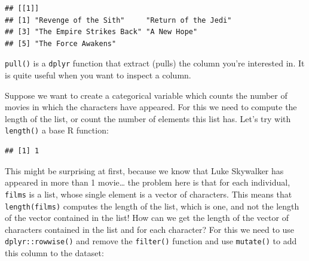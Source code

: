 \documentclass[]{gitbook}
\newenvironment{Shaded}{\begin{snugshade}}{\end{snugshade}}
\newcommand{\DataTypeTok}[1]{\textcolor[rgb]{0.13,0.29,0.53}{#1}}
\newcommand{\KeywordTok}[1]{\textcolor[rgb]{0.13,0.29,0.53}{\textbf{#1}}}
\newcommand{\NormalTok}[1]{#1}
\newcommand{\OperatorTok}[1]{\textcolor[rgb]{0.81,0.36,0.00}{\textbf{#1}}}
\newcommand{\StringTok}[1]{\textcolor[rgb]{0.31,0.60,0.02}{#1}}
\begin{document}
\begin{verbatim}
## [[1]]
## [1] "Revenge of the Sith"     "Return of the Jedi"     
## [3] "The Empire Strikes Back" "A New Hope"             
## [5] "The Force Awakens"
\end{verbatim}

\texttt{pull()} is a \texttt{dplyr} function that extract (pulls) the column you're interested in. It is quite
useful when you want to inspect a column.

Suppose we want to create a categorical variable which counts the number of movies in which the
characters have appeared. For this we need to compute the length of the list, or count the number
of elements this list has. Let's try with \texttt{length()} a base R function:

\begin{Shaded}
\end{Shaded}

\begin{verbatim}
## [1] 1
\end{verbatim}

This might be surprising at first, because we know that Luke Skywalker has appeared in more than 1
movie\ldots{} the problem here is that for each individual, \texttt{films} is a list, whose single element is
a vector of characters. This means that \texttt{length(films)} computes the length of the list, which is
one, and not the length of the vector contained in the list! How can we get the length of the
vector of characters contained in the list and for each character? For this we need to use
\texttt{dplyr::rowwise()} and remove the \texttt{filter()} function and use \texttt{mutate()} to add this column to the
dataset:

\begin{Shaded}
\end{Shaded}
\end{document}
